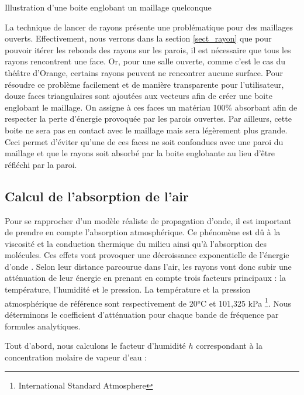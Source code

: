 \begin{figureth}
\begin{subfigureth}{0.35\textwidth}
		\label{boiteenglobante2}
	\end{subfigureth}
	\caption{Illustration d'une boite englobant un maillage quelconque}
\end{figureth}

La technique de lancer de rayons présente une problématique pour des maillages ouverts. Effectivement, nous verrons dans la section \ref{sect_rayon} que pour pouvoir itérer les rebonds des rayons sur les parois, il est nécessaire que tous les rayons rencontrent une face. Or, pour une salle ouverte, comme c'est le cas du théâtre d'Orange, certains rayons peuvent ne rencontrer aucune surface. Pour résoudre ce problème facilement et de manière transparente pour l'utilisateur, douze faces triangulaires sont ajoutées aux vecteurs afin de créer une boite englobant le maillage. On assigne à ces faces un matériau 100\% absorbant afin de respecter la perte d'énergie provoquée par les parois ouvertes. Par ailleurs, cette boite ne sera pas en contact avec le maillage mais sera légèrement plus grande. Ceci permet d'éviter qu'une de ces faces ne soit confondues avec une paroi du maillage et que le rayons soit absorbé par la boite englobante au lieu d'être réfléchi par la paroi.

\subsection{Calcul de l'absorption de l'air} \label{sect_absAIr}
Pour se rapprocher d'un modèle réaliste de propagation d'onde, il est important de prendre en compte l'absorption atmosphérique. Ce phénomène est dû à la viscosité et la conduction thermique du milieu ainsi qu'à l'absorption des molécules. Ces effets vont provoquer une décroissance exponentielle de l'énergie d'onde \cite[p. 68-70]{jouhaneau}. Selon leur distance parcourue dans l'air, les rayons vont donc subir une atténuation de leur énergie en prenant en compte trois facteurs principaux : la température, l'humidité et le pression. La température et la pression atmosphérique de référence sont respectivement de 20°C et 101,325 kPa \footnote{International Standard Atmosphere}. Nous déterminons le coefficient d'atténuation pour chaque bande de fréquence par formules analytiques. 

Tout d'abord, nous calculons le facteur d'humidité $h$ correspondant à la concentration molaire de vapeur d'eau \cite[Annexe B, B.1]{iso} :

